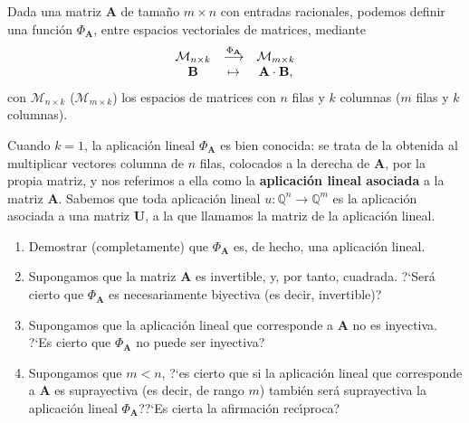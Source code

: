  
\begin{ejer}
 Dada una matriz $\mathbf{A}$ de tama\~no $m\times n$ con entradas racionales, 
podemos definir una
funci\'on $\Phi_{\mathbf{A}}$, entre espacios vectoriales de matrices,   
mediante 
  \begin{equation}\notag
   \begin{matrix}
    \mathcal{M}_{n\times
k}&\stackrel{\Phi_{\mathbf{A}}}{\longrightarrow}&\mathcal{M}_{m\times k}\\
    \mathbf{B}&\mapsto&\mathbf{A}\cdot \mathbf{B}, 
   \end{matrix}
\end{equation}
 \noindent con $\mathcal{M}_{n\times k}$ ($\mathcal{M}_{m\times k}$) los
espacios de matrices con $n$ filas y $k$ columnas ($m$ filas y $k$ columnas).
 
 Cuando $k=1$, la aplicaci\'on lineal $\Phi_{\mathbf{A}}$ es bien conocida:  se
trata de la obtenida al multiplicar vectores columna de $n$ filas, colocados a
la derecha de $\mathbf{A}$,  por la propia matriz, y nos referimos a ella como
la {\bf aplicaci\'on lineal asociada} a la matriz $\mathbf{A}$. 
 Sabemos que toda aplicaci\'on lineal $u:\mathbb{Q}^n\to \mathbb{Q}^m$ es la
aplicaci\'on asociada a una matriz $\mathbf{U}$, a la que llamamos {\sc la
matriz} de la aplicaci\'on lineal.
 
 \begin{enumerate}
 
  \item Demostrar (completamente) que $\Phi_{\mathbf{A}}$ es, de hecho,  una
aplicaci\'on lineal.
 
 \item Supongamos que la matriz $\mathbf{A}$ es invertible, y, por tanto,
cuadrada. ?`Ser\'a cierto que $\Phi_{\mathbf{A}}$ es necesariamente biyectiva
(es decir, invertible)? 
 
\item Supongamos que la aplicaci\'on lineal que corresponde a $\mathbf{A}$ {\sc
no} es inyectiva. ?`Es cierto que $\Phi_{\mathbf{A}}$ no puede ser inyectiva?

\item Supongamos que $m<n$, ?`es cierto que si la aplicaci\'on lineal que
corresponde a $\mathbf{A}$ es suprayectiva (es decir, de rango $m$) tambi\'en
ser\'a suprayectiva la aplicaci\'on lineal $\Phi_{\mathbf{A}}$??`Es cierta la
afirmaci\'on rec\'{\i}proca?
 

\end{enumerate}
\end{ejer}
